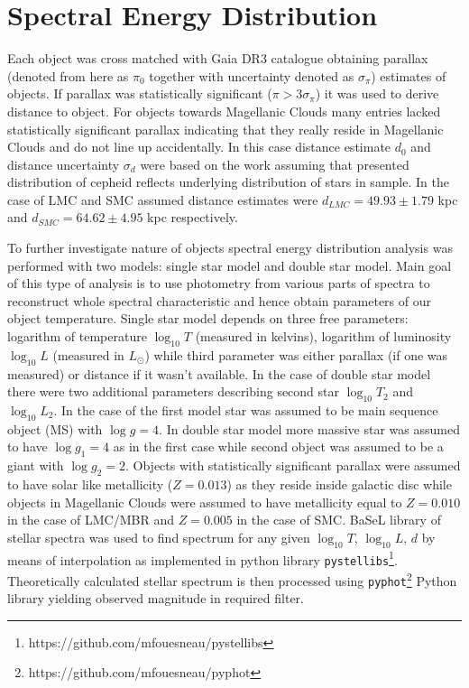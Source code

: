 \documentclass{pracalicmgr}
\begin{document}
\section{Spectral Energy Distribution}
Each object was cross matched  with Gaia DR3 catalogue obtaining parallax (denoted from here as $\pi_0$ together with uncertainty denoted as $\sigma_{\pi}$) estimates of objects. If parallax was statistically significant ($\pi>3\sigma_{\pi}$)
it was used to derive distance to object. For objects towards Magellanic Clouds many entries lacked statistically significant parallax indicating that they really reside in Magellanic Clouds
and do not line up accidentally.
In this case distance estimate $d_0$ and distance uncertainty $\sigma_d$ were based on the work \citep{jacyszyn-dobrzeniecka_ogle-ing_2016} assuming that presented distribution 
of cepheid reflects underlying distribution of stars in sample.
In the case of LMC and SMC assumed distance estimates were  $d_{LMC}=49.93\pm1.79$ kpc and  $d_{SMC}=64.62\pm4.95$ kpc respectively. 

To further investigate nature of objects spectral energy distribution analysis was 
performed with two models: single star model and double star model. Main goal of this type of analysis is to use photometry from various parts of spectra to
reconstruct whole spectral characteristic and hence obtain parameters of our object temperature.
Single star model depends on three free parameters: logarithm of temperature $\log_{10}T$ (measured in kelvins), logarithm of luminosity $\log_{10} L$ (measured in $L_{\odot}$) while third 
parameter was either parallax (if one was measured) or distance if it wasn't available. In the case of double star model there were two additional parameters describing 
second star $\log_{10} T_2$ and $\log_{10} L_2$. In the case of the first model star was assumed to be main sequence object (MS) with $\log{g}=4$. In double star model more massive star 
was assumed to have $\log{g_1}=4$ as in the first case while second object was assumed to be a giant with $\log{g_2}=2$. Objects with statistically significant parallax were assumed to have 
solar like metallicity ($Z=0.013$) as they reside inside galactic disc while objects in Magellanic Clouds 
were assumed to have metallicity equal to $Z=0.010$ in the case of LMC/MBR and $Z=0.005$ in the case of SMC.
BaSeL library of stellar spectra \citep{lejeune_standard_1998} was used to find spectrum for any given $\log_{10}{T}$, $\log_{10} L$, $d$ 
by means of interpolation as implemented in python library
\texttt{pystellibs}\footnote{https://github.com/mfouesneau/pystellibs}.
Theoretically calculated stellar spectrum is then processed using \texttt{pyphot}\footnote{https://github.com/mfouesneau/pyphot} 
Python library yielding observed magnitude in required filter.
\end{document}

